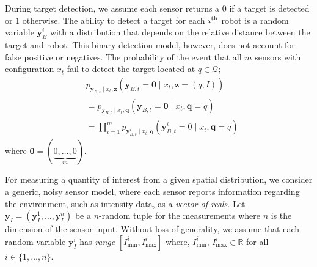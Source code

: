 \documentclass[letterpaper, 10 pt, conference]{ieeeconf}
\newcommand{\Ram}[1]{{\normalsize{\textbf{({\color{green}Ram:\ }#1)}}}}
\begin{document}
During target detection, we assume each sensor returns a $0$ if a target is detected or $1$ otherwise. 
The ability to detect a target for each $i^{\textup{th}}$ robot is a random variable $\bm{y}_B^i$ with a distribution that depends on the relative distance between the target and robot. 
This binary detection model, however, does not account for false positive or negatives.
The probability of the event that all $m$ sensors with configuration $x_t$ fail to detect the target located at $q \in \mathcal{Q}$;
\begin{align}
&p_{\bm{y}_{B,t} \mid
	{x}_{t},\bm{z}}\left(
\bm{y}_{B,t} = \bm{0} \mid {x}_{t},
\bm{z}=(q,I)\right) \\
&=p_{\bm{y}_{B,t} \mid
	{x}_{t},\bm{q}}\left(
\bm{y}_{B,t} = \bm{0} \mid {x}_{t},
\bm{q}=q\right) \\
&= \prod_{i=1}^m
p_{\bm{y}_{B,t}^i \mid
	{x}_{t},\bm{q}}\left(
\bm{y}_{B,t}^i = 0 \mid
{x}_{t},\bm{q}=q\right)
\end{align}
where $\bm{0}= (\underbrace{0,\dots,0}_{m})$.
 
For measuring a quantity of interest from a given spatial distribution, we consider a generic, noisy sensor model, where each sensor reports  information regarding the environment, such as intensity data, as a \emph{vector of reals}. 
Let $\bm{y}_I= (\bm{y}_I^1,\dots,\bm{y}_I^n)$ be a $n$-random tuple for the measurements where $n$ is the dimension of the sensor input. 
Without loss of generality, we assume that each random variable $\bm{y}_I^i$ has \emph{range} $[I_{\min}^i,I_{\max}^i]$ where, $I_{\min}^i,\,I_{\max}^i \in \mathbb{R}$ for all $i \in \lbrace 1,\dots,n \rbrace$.
\end{document}
